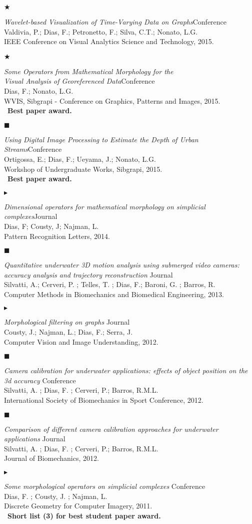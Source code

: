 \documentclass[12pt]{article}
\newcommand{\pub}[4]{
  {\emph{#1}\hfill{\small#2}\\
    #3\\
    #4}}%
\newcommand{\va}{\ensuremath{\bigstar}}
\newcommand{\gsp}{\ensuremath{\blacktriangleright}}
\newcommand{\cv}{\ensuremath{\blacksquare}}
\begin{document}
\item[\va]{
  \pub
      {Wavelet-based Visualization of Time-Varying Data on Graphs}{Conference}
      {Valdivia, P.; Dias, F.; Petronetto, F.; Silva, C.T.; Nonato, L.G.}
      {IEEE Conference on Visual Analytics Science and Technology, 2015.}
}
\item[\va]{
  \pub
      {Some Operators from Mathematical Morphology for the \\ Visual Analysis of Georeferenced Data}{Conference}
      {Dias, F.; Nonato, L.G.}
      {WVIS, Sibgrapi - Conference on Graphics, Patterns and Images, 2015.}
      \\~\textbf{Best paper award.}
} 
\item[\cv]{
  \pub
      {Using Digital Image Processing to Estimate the Depth of Urban Streams}{Conference}
      {Ortigossa, E.; Dias, F.; Ueyama, J.; Nonato, L.G.}
      {Workshop of Undergraduate Works, Sibgrapi, 2015.}
      \\~\textbf{Best paper award.}
}
\item[\gsp]{
  \pub
      {Dimensional operators for mathematical morphology on simplicial complexes}{Journal}
      {Dias, F; Cousty, J; Najman, L.}
      {Pattern  Recognition Letters, 2014.}
}
\item[\cv]{
  \pub
    {Quantitative underwater 3D motion analysis using submerged video cameras: \\
    accuracy analysis and trajectory reconstruction }{ Journal}
    {Silvatti, A.; Cerveri, P. ; Telles, T. ; Dias, F.; Baroni, G. ; Barros, R.}
    {Computer Methods in Biomechanics and Biomedical Engineering, 2013.}
}
\item[\gsp]{
  \pub
      {Morphological filtering on graphs }{ Journal}
      {Cousty, J.; Najman, L.; Dias, F.; Serra, J.}
      {Computer Vision and Image Understanding, 2012.}
}
\item[\cv]{
  \pub
      {\small Camera calibration for underwater applications:
        effects of object position on the 3d accuracy }{ Conference}
      {Silvatti, A. ; Dias, F. ; Cerveri, P.; Barros, R.M.L.}
      {International Society of Biomechanics in Sport Conference, 2012.}
}
\item[\cv]{
  \pub
      {Comparison of different camera calibration approaches for underwater applications }{ Journal}
      {Silvatti, A. ; Dias, F. ; Cerveri, P.; Barros, R.M.L.}
      {Journal of Biomechanics, 2012.}
}
\item[\gsp]{
  \pub
      {Some morphological operators on simplicial complexes }{ Conference}
      {Dias, F. ; Cousty, J. ; Najman, L.}
      {Discrete Geometry for Computer Imagery, 2011.}
      \\~\textbf{Short list (3) for best student paper award.}
}
\end{document}
